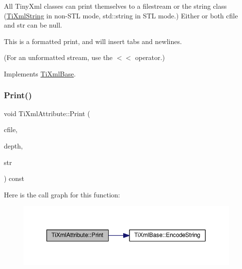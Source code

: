 All Tiny\+Xml classes can print themselves to a filestream or the string class (\hyperlink{class_ti_xml_string}{Ti\+Xml\+String} in non-\/\+S\+TL mode, std\+::string in S\+TL mode.) Either or both cfile and str can be null.

This is a formatted print, and will insert tabs and newlines.

(For an unformatted stream, use the $<$$<$ operator.) 

Implements \hyperlink{class_ti_xml_base_a0de56b3f2ef14c65091a3b916437b512}{Ti\+Xml\+Base}.

\mbox{\label{class_ti_xml_attribute_a5c8f72a7d1a49972434d45f4c2889e0e}} 
\subsubsection{\texorpdfstring{Print()}{Print()}\hspace{0.1cm}{\footnotesize\ttfamily [2/2]}}
{\footnotesize\ttfamily void Ti\+Xml\+Attribute\+::\+Print (\begin{DoxyParamCaption}\item[{F\+I\+LE $\ast$}]{cfile,  }\item[{int}]{depth,  }\item[{\hyperlink{tinyxml_8h_a92bada05fd84d9a0c9a5bbe53de26887}{T\+I\+X\+M\+L\+\_\+\+S\+T\+R\+I\+NG} $\ast$}]{str }\end{DoxyParamCaption}) const}

Here is the call graph for this function\+:\nopagebreak
\begin{figure}[H]
\begin{center}
\leavevmode
\includegraphics[width=350pt]{class_ti_xml_attribute_a5c8f72a7d1a49972434d45f4c2889e0e_cgraph}
\end{center}
\end{figure}
\mbox{\label{class_ti_xml_attribute_a6fa41b710c1b79de37a97004aa600c06}} 
